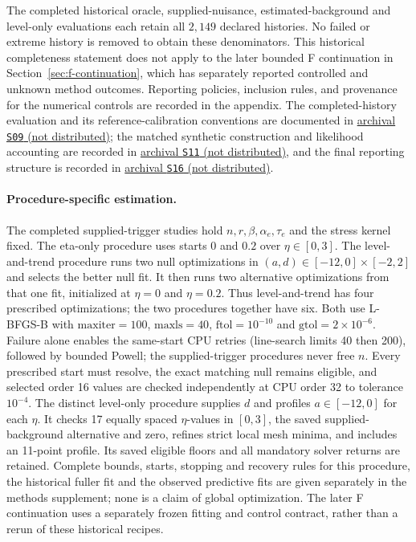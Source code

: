 The completed historical oracle, supplied-nuisance, estimated-background and level-only evaluations each retain all \(2{,}149\) declared histories. No failed or extreme history is removed to obtain these denominators. This historical completeness statement does not apply to the later bounded F continuation in Section~\ref{sec:f-continuation}, which has separately reported controlled and unknown method outcomes. Reporting policies, inclusion rules, and provenance for the numerical controls are recorded in the appendix. The completed-history evaluation and its reference-calibration conventions are documented in \hyperlink{S09}{archival \texttt{S09} (not distributed)}; the matched synthetic construction and likelihood accounting are recorded in \hyperlink{S11}{archival \texttt{S11} (not distributed)}, and the final reporting structure is recorded in \hyperlink{S16}{archival \texttt{S16} (not distributed)}.

\paragraph{Procedure-specific estimation.}
The completed supplied-trigger studies hold \(n,r,\beta,\alpha_e,\tau_e\) and the stress kernel fixed. The eta-only procedure uses starts \(0\) and \(0.2\) over \(\eta\in[0,3]\). The level-and-trend procedure runs two null optimizations in \((a,d)\in[-12,0]\times[-2,2]\) and selects the better null fit. It then runs two alternative optimizations from that one fit, initialized at \(\eta=0\) and \(\eta=0.2\). Thus level-and-trend has four prescribed optimizations; the two procedures together have six. Both use L-BFGS-B with \(\mathrm{maxiter}=100\), \(\mathrm{maxls}=40\), \(\mathrm{ftol}=10^{-10}\) and \(\mathrm{gtol}=2\times10^{-6}\). Failure alone enables the same-start CPU retries (line-search limits 40 then 200), followed by bounded Powell; the supplied-trigger procedures never free \(n\). Every prescribed start must resolve, the exact matching null remains eligible, and selected order 16 values are checked independently at CPU order 32 to tolerance \(10^{-4}\).
The distinct level-only procedure supplies \(d\) and profiles \(a\in[-12,0]\) for each \(\eta\). It checks 17 equally spaced \(\eta\)-values in \([0,3]\), the saved supplied-background alternative and zero, refines strict local mesh minima, and includes an 11-point profile. Its saved eligible floors and all mandatory solver returns are retained. Complete bounds, starts, stopping and recovery rules for this procedure, the historical fuller fit and the observed predictive fits are given separately in the methods supplement; none is a claim of global optimization. The later F continuation uses a separately frozen fitting and control contract, rather than a rerun of these historical recipes.

